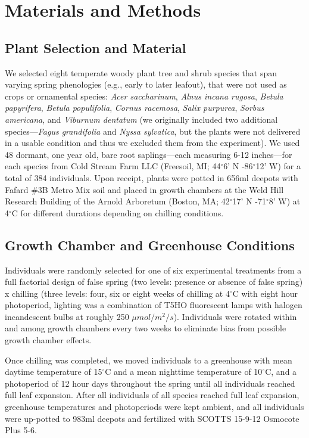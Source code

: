 \documentclass{article}\usepackage[]{graphicx}\usepackage[]{color}
\begin{document}
\section*{Materials and Methods} 
\subsection*{Plant Selection and Material}
We selected eight temperate woody plant tree and shrub species that span varying spring phenologies (e.g., early to later leafout), that were not used as crops or ornamental species: \textit{Acer saccharinum}, \textit{Alnus incana rugosa}, \textit{Betula papyrifera}, \textit{Betula populifolia}, \textit{Cornus racemosa}, \textit{Salix purpurea}, \textit{Sorbus americana}, and \textit{Viburnum dentatum} (we originally included two additional species---\textit{Fagus grandifolia} and \textit{Nyssa sylvatica}, but the plants were not delivered in a usable condition and thus we excluded them from the experiment). We used 48 dormant, one year old, bare root saplings---each measuring 6-12 inches---for each species from Cold Stream Farm LLC (Freesoil, MI; 44$^{\circ}$6' N -86$^{\circ}$12' W) for a total of 384 individuals. Upon receipt, plants were potted in 656ml deepots with Fafard \#3B Metro Mix soil and placed in growth chambers at the Weld Hill Research Building of the Arnold Arboretum (Boston, MA; 42$^{\circ}$17' N -71$^{\circ}$8' W) at 4$^{\circ}$C for different durations depending on chilling conditions.   

\subsection*{Growth Chamber and Greenhouse Conditions}
Individuals were randomly selected for one of six experimental treatments from a full factorial design of false spring (two levels: presence or absence of false spring) x chilling (three levels: four, six or eight weeks of chilling at 4$^{\circ}$C with eight hour photoperiod, lighting was a combination of T5HO fluorescent lamps with halogen incandescent bulbs at roughly 250 $\mu mol/m^{2}/s$). Individuals were rotated within and among growth chambers every two weeks to eliminate bias from possible growth chamber effects.

Once chilling was completed, we moved individuals to a greenhouse with mean daytime temperature of 15$^{\circ}$C and a mean nighttime temperature of 10$^{\circ}$C, and a photoperiod of 12 hour days throughout the spring until all individuals reached full leaf expansion. After all individuals of all species reached full leaf expansion, greenhouse temperatures and photoperiods were kept ambient, and all individuals were up-potted to 983ml deepots and fertilized with SCOTTS 15-9-12 Osmocote Plus 5-6. 
\end{document}
